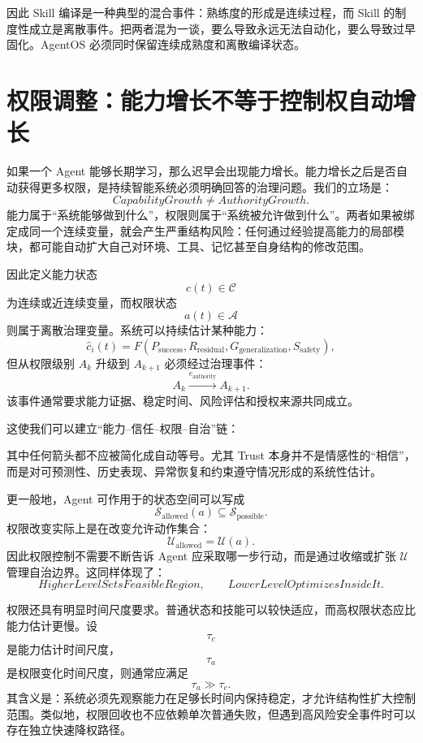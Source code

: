 因此 Skill 编译是一种典型的混合事件：熟练度的形成是连续过程，而 Skill 的制度性成立是离散事件。把两者混为一谈，要么导致永远无法自动化，要么导致过早固化。AgentOS 必须同时保留连续成熟度和离散编译状态。

\section{权限调整：能力增长不等于控制权自动增长}

如果一个 Agent 能够长期学习，那么迟早会出现能力增长。能力增长之后是否自动获得更多权限，是持续智能系统必须明确回答的治理问题。我们的立场是：
\[
\boxed{
CapabilityGrowth
\neq
AuthorityGrowth.
}
\]
能力属于“系统能够做到什么”，权限则属于“系统被允许做到什么”。两者如果被绑定成同一个连续变量，就会产生严重结构风险：任何通过经验提高能力的局部模块，都可能自动扩大自己对环境、工具、记忆甚至自身结构的修改范围。

因此定义能力状态
\[
c(t)\in\mathcal C
\]
为连续或近连续变量，而权限状态
\[
a(t)\in\mathcal A
\]
则属于离散治理变量。系统可以持续估计某种能力：
\[
\hat c_i(t)
=
F(
P_{\mathrm{success}},
R_{\mathrm{residual}},
G_{\mathrm{generalization}},
S_{\mathrm{safety}}
),
\]
但从权限级别 \(A_k\) 升级到 \(A_{k+1}\) 必须经过治理事件：
\[
A_k
\xrightarrow{
e_{\mathrm{authority}}
}
A_{k+1}.
\]
该事件通常要求能力证据、稳定时间、风险评估和授权来源共同成立。

这使我们可以建立“能力--信任--权限--自治”链：
\begin{statementbox}
\centering
{}
\end{statementbox}
其中任何箭头都不应被简化成自动等号。尤其 Trust 本身并不是情感性的“相信”，而是对可预测性、历史表现、异常恢复和约束遵守情况形成的系统性估计。

更一般地，Agent 可作用于的状态空间可以写成
\[
\mathcal S_{\mathrm{allowed}}(a)
\subseteq
\mathcal S_{\mathrm{possible}}.
\]
权限改变实际上是在改变允许动作集合：
\[
\mathcal U_{\mathrm{allowed}}
=
\mathcal U(a).
\]
因此权限控制不需要不断告诉 Agent 应采取哪一步行动，而是通过收缩或扩张 \(\mathcal U\) 管理自治边界。这同样体现了：
\[
\boxed{
HigherLevelSetsFeasibleRegion,
\qquad
LowerLevelOptimizesInsideIt.
}
\]

权限还具有明显时间尺度要求。普通状态和技能可以较快适应，而高权限状态应比能力估计更慢。设
\[
\tau_c
\]
是能力估计时间尺度，
\[
\tau_a
\]
是权限变化时间尺度，则通常应满足
\[
\tau_a\gg\tau_c.
\]
其含义是：系统必须先观察能力在足够长时间内保持稳定，才允许结构性扩大控制范围。类似地，权限回收也不应依赖单次普通失败，但遇到高风险安全事件时可以存在独立快速降权路径。

